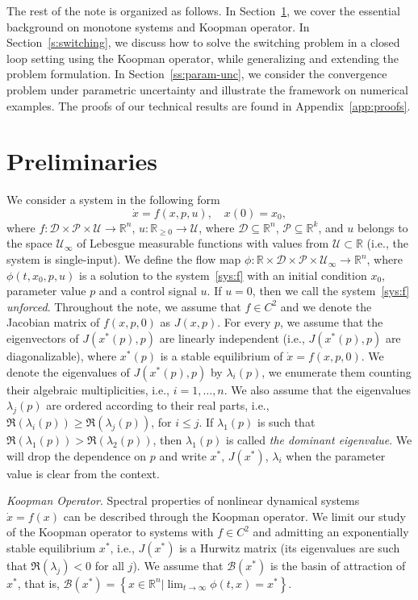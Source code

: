 \documentclass[letterpaper, 10pt, journal]{IEEEtran}  %
\newcommand{\R}{{\mathbb R}}
\newcommand{\cB}{{\mathcal B}}
\newcommand{\cD}{{\mathcal D}}
\newcommand{\cP}{{\mathcal P}}
\newcommand{\cU}{{\mathcal U}}
\begin{document}
The rest of the note is organized as follows. In Section~\ref{s:prel}, we cover the essential background on monotone systems and Koopman operator. In Section~\ref{s:switching}, we discuss how to solve the switching problem in a closed loop setting using the Koopman operator, while generalizing and extending the problem formulation. In Section~\ref{ss:param-unc}, we consider the convergence problem under parametric uncertainty and illustrate the framework on numerical examples. The proofs of our technical results are found in Appendix~\ref{app:proofs}.

\section{Preliminaries}
\label{s:prel}
We consider a system in the following form
\begin{equation}
\label{sys:f}
\dot x = f(x,p, u),\quad x(0) = x_0,
\end{equation} 
where $f: \cD\times \cP \times \cU\rightarrow \R^n$,  $u:\R_{\ge 0}\rightarrow \cU$, where $\cD\subseteq\R^n$, $\cP \subseteq\R^k$, and $u$ belongs to the space $\cU_{\infty}$ of Lebesgue measurable functions with values from $\cU\subset\R$ (i.e., the system is single-input). We define the flow map $\phi: \R \times \cD \times \cP \times \cU_{\infty}\rightarrow \R^n$, where $\phi(t, x_0, p, u)$ is a solution to the system~\eqref{sys:f} with an initial condition $x_0$, parameter value $p$ and a control signal $u$. If $u=0$, then we call the system~\eqref{sys:f} \emph{unforced}. Throughout the note, we assume that $f\in C^2$ and we denote the Jacobian matrix of $f(x,p,0)$ as $J(x,p)$. For every $p$, we assume that the eigenvectors of $J(x^\ast(p),p)$ are linearly independent (i.e., $J(x^\ast(p), p)$ are diagonalizable), where $x^\ast(p)$ is a stable equilibrium of $\dot x = f(x, p, 0)$. We denote the eigenvalues of $J(x^\ast(p), p)$ by $\lambda_i(p)$, we enumerate them counting their algebraic multiplicities, i.e., $i = 1,\dots, n$. 
We also assume that the eigenvalues $\lambda_j(p)$ are ordered according to their real parts, i.e.,  $\Re(\lambda_i(p)) \ge \Re(\lambda_j(p))$, for $i\le j$. If $\lambda_1(p)$ is such that $\Re(\lambda_1(p))> \Re(\lambda_2(p))$, then $\lambda_1(p)$ is called \emph{the dominant eigenvalue}. We will drop the dependence on $p$ and write $x^\ast$, $J(x^\ast)$, $\lambda_i$ when the parameter value is clear from the context. 

\emph{Koopman Operator}.  Spectral properties of nonlinear dynamical systems $\dot x = f(x)$ can be described through the Koopman operator. We limit our study of the Koopman operator to systems with $f\in C^2$ and admitting an exponentially stable equilibrium $x^\ast$, i.e., $J(x^\ast)$ is a Hurwitz matrix (its eigenvalues are such that $\Re(\lambda_j) <0$ for all $j$). We assume that $\cB(x^\ast)$ is the basin of attraction of $x^\ast$, that is, $\cB(x^\ast) = \left\{ x\in \R^n \bigl| \lim_{t\rightarrow\infty}\phi(t,x) = x^\ast \right\}$.
\end{document}
